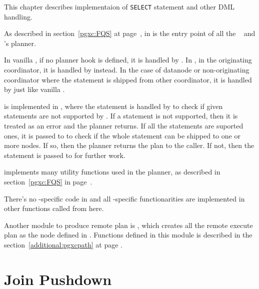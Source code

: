 %
%

  This chapter describes implementaion of \texttt{SELECT} statement and other DML handling.
  
  As described in section~\ref{pgxc:FQS} at page~\pageref{pgxc:FQS}, 
  in  is the entry point of all the \PG~ and \XC's planner.
  
  In vanilla \PG, if no planner hook is defined, it is handled by .
  In \XC, in the originating coordinator, it is handled by  instead.
  In the case of datanode or non-originating coordinator where
  the statement is shipped from other coordinator,
  it is handled by  just like vanilla \PG.
  
   is implemented in , where the statement is handled by
   to check if given statements are not supported by \XC.
  If a statement is not supported, then it is treated as an error and the planner returns.
  If all the statements are suported ones, it is passed to  to check if
  the whole statement can be shipped to one or more nodes.
  If so, then the planner returns the plan to the caller.
  If not, then the statement is passed to  for further work.
  
   implements many utility functions used in the planner, as described in
  section~\ref{pgxc:FQS} in page~\pageref{pgxc:FQS}.
  
  There's no \XC-specific code in  and all \XC-specific
  functionarities are 
  implemented in other functions called from here.
  
  Another module to produce remote plan is , which creates all the
  remote execute plan
  as the node  defined in .
  Functions defined in this module is described in the section~\ref{additional:pgxcpath} at
  page \pageref{additional:pgxcpath}.



\section{\label{sec:joinPushdown}Join Pushdown}

